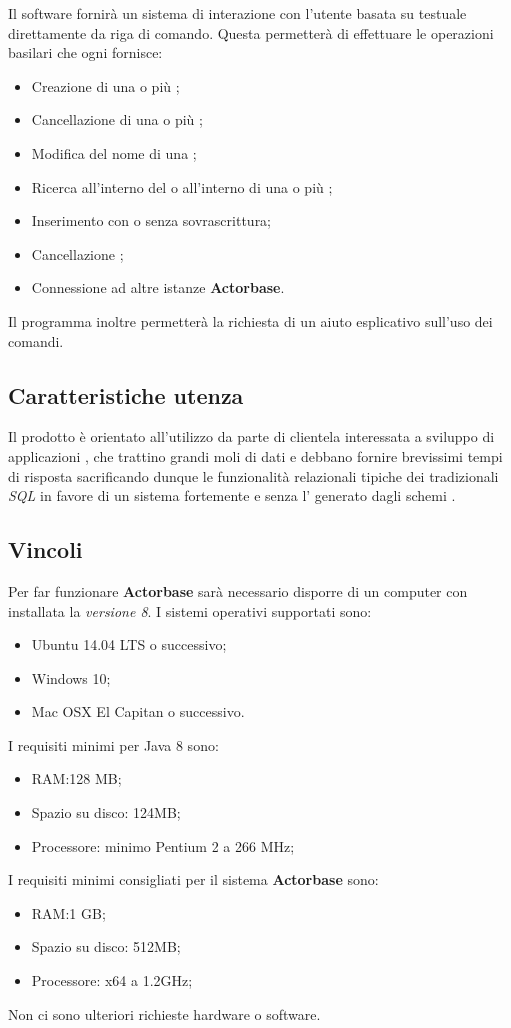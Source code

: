 \documentclass{scalatekids-article}
\begin{document}
Il software fornirà un sistema di interazione con l'utente basata su 
testuale direttamente da riga di comando. Questa permetterà di effettuare le operazioni
basilari che ogni  fornisce:
\begin{itemize}
\item Creazione di una o più ;
\item Cancellazione di una o più ;
\item Modifica del nome di una ;
\item Ricerca all'interno del  o all'interno di una o più ;
\item Inserimento  con o senza sovrascrittura;
\item Cancellazione ;
\item Connessione ad altre istanze \textbf{Actorbase}.
\end{itemize}
Il programma inoltre permetterà la richiesta di un aiuto esplicativo sull'uso
dei comandi.

\subsection{Caratteristiche utenza}

Il prodotto è orientato all'utilizzo da parte di clientela interessata a
sviluppo di applicazioni , che trattino grandi moli di dati e
debbano fornire brevissimi tempi di risposta sacrificando dunque le funzionalità
relazionali tipiche dei tradizionali  \textit{SQL} in favore di
un sistema fortemente  e senza l' generato
dagli schemi .

\subsection{Vincoli}
Per far funzionare \textbf{Actorbase} sarà necessario disporre di un computer con
installata la \textit{ versione 8}. I sistemi operativi supportati sono:
\begin{itemize}
\item Ubuntu 14.04 LTS o successivo;
\item Windows 10;
\item Mac OSX El Capitan o successivo.
\end{itemize}
I requisiti minimi per Java 8 sono:
\begin{itemize}
\item RAM:\@128 MB;\@
\item Spazio su disco: 124MB;\@
\item Processore: minimo Pentium 2 a 266 MHz;
\end{itemize}
I requisiti minimi consigliati per il sistema \textbf{Actorbase} sono:
\begin{itemize}
\item RAM:\@1 GB;\@
\item Spazio su disco: 512MB;\@
\item Processore: x64 a 1.2GHz;
\end{itemize}
Non ci sono ulteriori richieste hardware o software.
\end{document}
